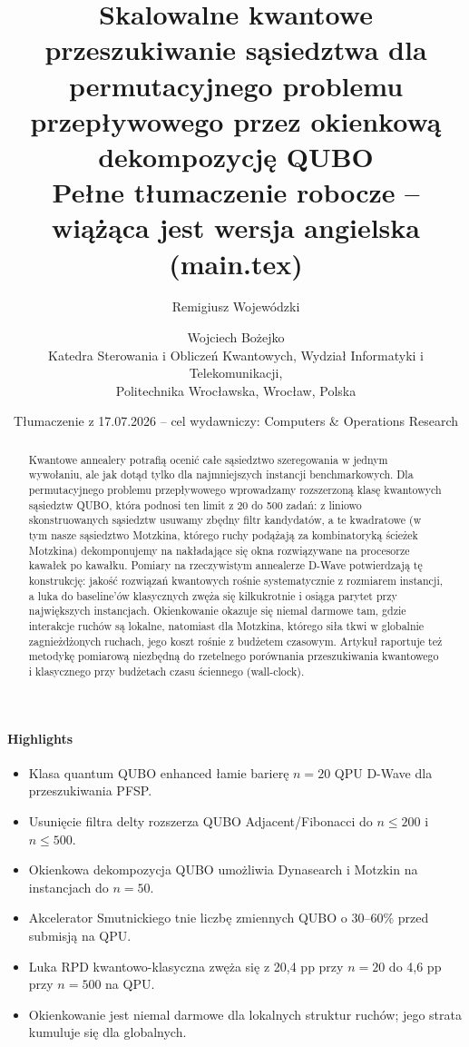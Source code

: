 \documentclass[11pt,a4paper]{article}
\title{Skalowalne kwantowe przeszukiwanie sąsiedztwa dla permutacyjnego
  problemu przepływowego przez okienkową dekompozycję QUBO\\[2pt]
  \large Pełne tłumaczenie robocze -- wiążąca jest wersja angielska (main.tex)}
\author{Remigiusz Wojewódzki \and Wojciech Bożejko\\
  \small Katedra Sterowania i Obliczeń Kwantowych, Wydział Informatyki
  i Telekomunikacji,\\ \small Politechnika Wrocławska, Wrocław, Polska}
\date{Tłumaczenie z 17.07.2026 -- cel wydawniczy: Computers \& Operations Research}
\begin{document}
\maketitle

\begin{abstract}
Kwantowe annealery potrafią ocenić całe sąsiedztwo szeregowania
w jednym wywołaniu, ale jak dotąd tylko dla najmniejszych instancji
benchmarkowych. Dla permutacyjnego problemu przepływowego wprowadzamy
rozszerzoną klasę kwantowych sąsiedztw QUBO, która podnosi ten limit
z 20 do 500 zadań: z liniowo skonstruowanych sąsiedztw usuwamy zbędny
filtr kandydatów, a te kwadratowe (w tym nasze sąsiedztwo Motzkina,
którego ruchy podążają za kombinatoryką ścieżek Motzkina) dekomponujemy
na nakładające się okna rozwiązywane na procesorze kawałek po kawałku.
Pomiary na rzeczywistym annealerze D-Wave potwierdzają tę konstrukcję:
jakość rozwiązań kwantowych rośnie systematycznie z rozmiarem instancji,
a luka do baseline'ów klasycznych zwęża się kilkukrotnie i osiąga
parytet przy największych instancjach. Okienkowanie okazuje się niemal
darmowe tam, gdzie interakcje ruchów są lokalne, natomiast dla Motzkina,
którego siła tkwi w globalnie zagnieżdżonych ruchach, jego koszt rośnie
z budżetem czasowym. Artykuł raportuje też metodykę pomiarową niezbędną
do rzetelnego porównania przeszukiwania kwantowego i klasycznego przy
budżetach czasu ściennego (wall-clock).
\end{abstract}

\paragraph{Highlights}
\begin{itemize}
  \item Klasa quantum QUBO enhanced łamie barierę $n=20$ QPU D-Wave dla przeszukiwania PFSP.
  \item Usunięcie filtra delty rozszerza QUBO Adjacent/Fibonacci do $n\le200$ i $n\le500$.
  \item Okienkowa dekompozycja QUBO umożliwia Dynasearch i Motzkin na instancjach do $n=50$.
  \item Akcelerator Smutnickiego tnie liczbę zmiennych QUBO o 30--60\% przed submisją na QPU.
  \item Luka RPD kwantowo-klasyczna zwęża się z 20{,}4 pp przy $n=20$ do 4{,}6 pp przy $n=500$ na QPU.
  \item Okienkowanie jest niemal darmowe dla lokalnych struktur ruchów; jego strata kumuluje się dla globalnych.
\end{itemize}
\end{document}
